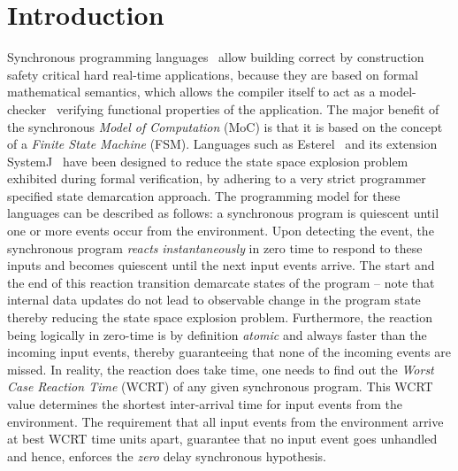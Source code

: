 \section{Introduction}
\label{sec:introduction}

Synchronous programming languages~\cite{berry92} allow building correct
by construction safety critical hard real-time applications, because
they are based on formal mathematical semantics, which allows the
compiler itself to act as a model-checker~\cite{jagadeesan1995safety}
verifying functional properties of the application. The major benefit of
the synchronous \textit{Model of Computation} (MoC) is that it is based
on the concept of a \textit{Finite State Machine} (FSM). Languages such
as Esterel~\cite{berry92} and its extension SystemJ~\cite{amal10} have
been designed to reduce the state space explosion problem exhibited
during formal verification, by adhering to a very strict programmer
specified state demarcation approach. The programming model for these
languages can be described as follows: a synchronous program is
quiescent until one or more events occur from the environment. Upon
detecting the event, the synchronous program \textit{reacts}
\textit{instantaneously} in zero time to respond to these inputs and
becomes quiescent until the next input events arrive. The start and the
end of this reaction transition demarcate states of the program -- note
that internal data updates do not lead to observable change in the
program state thereby reducing the state space explosion problem.
Furthermore, the reaction being logically in zero-time is by definition
\textit{atomic} and always faster than the incoming input events,
thereby guaranteeing that none of the incoming events are missed. In
reality, the reaction does take time, one needs to find out the
\textit{Worst Case Reaction Time} (WCRT) of any given synchronous
program. This WCRT value determines the shortest inter-arrival time for
input events from the environment. {\color{black} The requirement that
  all input events from the environment arrive at best WCRT time units
  apart, guarantee that no input event goes unhandled and hence,
  enforces the \textit{zero} delay synchronous hypothesis.}

